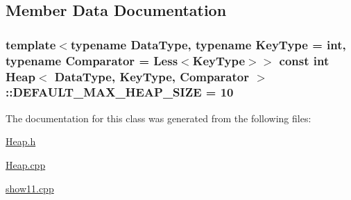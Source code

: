 \subsection{Member Data Documentation}
\hypertarget{class_heap_a967c19732a20a72e8e824402ad6763c8}{
\subsubsection[{D\+E\+F\+A\+U\+L\+T\+\_\+\+M\+A\+X\+\_\+\+H\+E\+A\+P\+\_\+\+S\+I\+Z\+E}]{\setlength{\rightskip}{0pt plus 5cm}template$<$typename Data\+Type, typename Key\+Type  = int, typename Comparator  = Less$<$\+Key\+Type$>$$>$ const int {\bf Heap}$<$ Data\+Type, Key\+Type, Comparator $>$\+::D\+E\+F\+A\+U\+L\+T\+\_\+\+M\+A\+X\+\_\+\+H\+E\+A\+P\+\_\+\+S\+I\+Z\+E = 10\hspace{0.3cm}{\ttfamily [static]}}}\label{class_heap_a967c19732a20a72e8e824402ad6763c8}


The documentation for this class was generated from the following files\+:\begin{DoxyCompactItemize}
\item 
\hyperlink{_heap_8h}{Heap.\+h}\item 
\hyperlink{_heap_8cpp}{Heap.\+cpp}\item 
\hyperlink{show11_8cpp}{show11.\+cpp}\end{DoxyCompactItemize}
